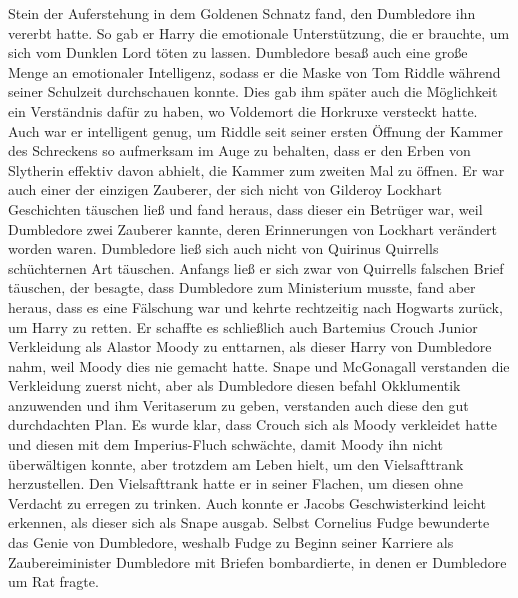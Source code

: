 \documentclass[a4paper, 10pt]{article}
\begin{document}
Stein der Auferstehung in dem Goldenen Schnatz fand, den Dumbledore ihn vererbt hatte. So gab er Harry die emotionale Unterstützung, die er brauchte, um sich vom Dunklen Lord töten zu lassen. Dumbledore besaß auch eine große Menge an emotionaler Intelligenz, sodass er die Maske von Tom Riddle während seiner Schulzeit durchschauen konnte. Dies gab ihm später auch die Möglichkeit ein Verständnis dafür zu haben, wo Voldemort die Horkruxe versteckt hatte. Auch war er intelligent genug, um Riddle seit seiner ersten Öffnung der Kammer des Schreckens so aufmerksam im Auge zu behalten, dass er den Erben von Slytherin effektiv davon abhielt, die Kammer zum zweiten Mal zu öffnen. Er war auch einer der einzigen Zauberer, der sich nicht von Gilderoy Lockhart Geschichten täuschen ließ und fand heraus, dass dieser ein Betrüger war, weil Dumbledore zwei Zauberer kannte, deren Erinnerungen von Lockhart verändert worden waren. Dumbledore ließ sich auch nicht von Quirinus Quirrells schüchternen Art täuschen. Anfangs ließ er sich zwar von Quirrells falschen Brief täuschen, der besagte, dass Dumbledore zum Ministerium musste, fand aber heraus, dass es eine Fälschung war und kehrte rechtzeitig nach Hogwarts zurück, um Harry zu retten. Er schaffte es schließlich auch Bartemius Crouch Junior Verkleidung als Alastor Moody zu enttarnen, als dieser Harry von Dumbledore nahm, weil Moody dies nie gemacht hatte. Snape und McGonagall verstanden die Verkleidung zuerst nicht, aber als Dumbledore diesen befahl Okklumentik anzuwenden und ihm Veritaserum zu geben, verstanden auch diese den gut durchdachten Plan. Es wurde klar, dass Crouch sich als Moody verkleidet hatte und diesen mit dem Imperius-Fluch schwächte, damit Moody ihn nicht überwältigen konnte, aber trotzdem am Leben hielt, um den Vielsafttrank herzustellen. Den Vielsafttrank hatte er in seiner Flachen, um diesen ohne Verdacht zu erregen zu trinken. Auch konnte er Jacobs Geschwisterkind leicht erkennen, als dieser sich als Snape ausgab. Selbst Cornelius Fudge bewunderte das Genie von Dumbledore, weshalb Fudge zu Beginn seiner Karriere als Zaubereiminister Dumbledore mit Briefen bombardierte, in denen er Dumbledore um Rat fragte.
\end{document}
